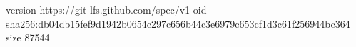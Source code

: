 version https://git-lfs.github.com/spec/v1
oid sha256:db04db15fef9d1942b0654c297c656b44c3e6979c653cf1d3c61f256944bc364
size 87544
